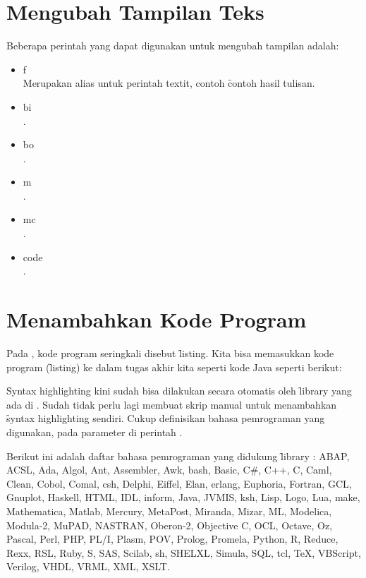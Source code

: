 \section{Mengubah Tampilan Teks}
\label{sec:textFormatting}
Beberapa perintah yang dapat digunakan untuk mengubah tampilan adalah:
\begin{itemize}
	\item \bslash{}f \\
	Merupakan alias untuk perintah \bslash textit, contoh
	\f{contoh hasil tulisan}.
	\item \bslash{}bi \\
	.
	\item \bslash{}bo \\
	.
	\item \bslash{}m \\
	.
	\item \bslash{}mc \\
	.
	\item \bslash{}code \\
	.
\end{itemize}


\section{Menambahkan Kode Program}
\label{sec:codeListing}
Pada \latex, kode program seringkali disebut \f{listing}. Kita bisa memasukkan kode program (\f{listing}) ke dalam tugas akhir kita seperti kode Java seperti berikut:


\f{Syntax highlighting} kini sudah bisa dilakukan secara otomatis oleh \f{library} yang ada di \latex.
Sudah tidak perlu lagi membuat skrip manual untuk menambahkan \f{syntax highlighting} sendiri.
Cukup definisikan bahasa pemrograman yang digunakan, pada parameter  di perintah .

Berikut ini adalah daftar bahasa pemrograman yang didukung \f{library} : ABAP, ACSL, Ada, Algol, Ant, Assembler, Awk, bash, Basic, C\#, C++, C, Caml, Clean, Cobol, Comal, csh, Delphi, Eiffel, Elan, erlang, Euphoria, Fortran, GCL, Gnuplot, Haskell, HTML, IDL, inform, Java, JVMIS, ksh, Lisp, Logo, Lua, make, Mathematica, Matlab, Mercury, MetaPost, Miranda, Mizar, ML, Modelica, Modula-2, MuPAD, NASTRAN, Oberon-2, Objective C, OCL, Octave, Oz, Pascal, Perl, PHP, PL/I, Plasm, POV, Prolog, Promela, Python, R, Reduce, Rexx, RSL, Ruby, S, SAS, Scilab, sh, SHELXL, Simula, SQL, tcl, TeX, VBScript, Verilog, VHDL, VRML, XML, XSLT. \citep{latex:source_code_listings}

